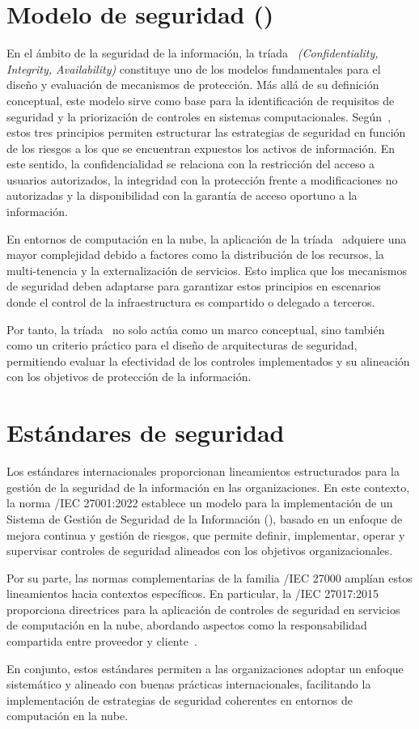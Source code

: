 \section{Modelo de seguridad (\CIA)}
\noindent
En el ámbito de la seguridad de la información, la tríada \CIA\ \textit{(Confidentiality, Integrity, Availability)} constituye uno de los modelos 
fundamentales para el diseño y evaluación de mecanismos de protección. Más allá de su definición conceptual, este modelo sirve como base para la 
identificación de requisitos de seguridad y la priorización de controles en sistemas computacionales. Según~\cite{stallings2012computer}, estos tres 
principios permiten estructurar las estrategias de seguridad en función de los riesgos a los que se encuentran expuestos los activos de información. 
En este sentido, la confidencialidad se relaciona con la restricción del acceso a usuarios autorizados, la integridad con la protección frente a 
modificaciones no autorizadas y la disponibilidad con la garantía de acceso oportuno a la información.

En entornos de computación en la nube, la aplicación de la tríada \CIA\ adquiere una mayor complejidad debido a factores como la distribución de los 
recursos, la multi-tenencia y la externalización de servicios. Esto implica que los mecanismos de seguridad deben adaptarse para garantizar estos principios 
en escenarios donde el control de la infraestructura es compartido o delegado a terceros.

Por tanto, la tríada \CIA\ no solo actúa como un marco conceptual, sino también como un criterio práctico para el diseño de arquitecturas de seguridad, 
permitiendo evaluar la efectividad de los controles implementados y su alineación con los objetivos de protección de la información.

\section{Estándares de seguridad}
\noindent
Los estándares internacionales proporcionan lineamientos estructurados para la gestión de la seguridad de la información en las 
organizaciones. En este contexto, la norma \ISO/IEC 27001:2022 establece un modelo para la implementación de un Sistema de Gestión de 
Seguridad de la Información (\SGSI), basado en un enfoque de mejora continua y gestión de riesgos, que permite definir, implementar, 
operar y supervisar controles de seguridad alineados con los objetivos organizacionales.~\cite{iso27001}

Por su parte, las normas complementarias de la familia \ISO/IEC 27000 amplían estos lineamientos hacia contextos específicos. En 
particular, la \ISO/IEC 27017:2015 proporciona directrices para la aplicación de controles de seguridad en servicios de computación en 
la nube, abordando aspectos como la responsabilidad compartida entre proveedor y cliente~\cite{iso27017}.

En conjunto, estos estándares permiten a las organizaciones adoptar un enfoque sistemático y alineado con buenas prácticas 
internacionales, facilitando la implementación de estrategias de seguridad coherentes en entornos de computación en la nube.
